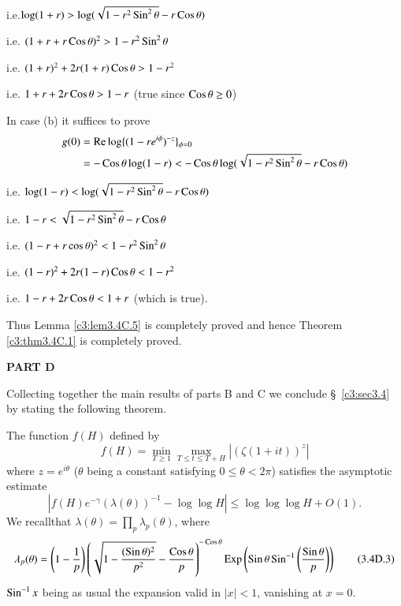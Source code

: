i.e.\pageoriginale $\log (1+r) > \log(\sqrt{1-r^2 \operatorname{Sin}^2 \theta} - r \operatorname{Cos} \theta)$

i.e. $(1+r + r \operatorname{Cos} \theta)^2 > 1 - r^2 \operatorname{Sin}^2 \theta$

i.e. $(1+r)^2 + 2 r (1+r) \operatorname{Cos} \theta > 1 -r^2$

i.e. $1+ r + 2r \operatorname{Cos} \theta > 1 - r$ (true since $\operatorname{Cos} \theta \geq 0$)

In case (b) it suffices to prove
\begin{align*}
g(0) & = \operatorname{Re} \log \{(1-re^{i\phi})^{-z}\}_{\phi = 0}\\
& = - \operatorname{Cos} \theta \log (1-r) < - \operatorname{Cos} \theta \log (\sqrt{1-r^2 \operatorname{Sin}^2 \theta } - r \operatorname{Cos} \theta) 
\end{align*}

i.e. $\log (1-r) < \log (\sqrt{1-r^2 \operatorname{Sin}^2 \theta} -r \operatorname{Cos} \theta)$

i.e. $1-r< \sqrt{1-r^2 \operatorname{Sin}^2 \theta} - r \operatorname{Cos} \theta$

i.e. $(1-r + r \cos \theta)^2 < 1- r^2 \operatorname{Sin}^2 \theta$

i.e. $(1-r)^2 + 2 r (1-r) \operatorname{Cos} \theta < 1 - r^2$

i.e. $1-r + 2 r \operatorname{Cos} \theta <1 + r $ (which is true).

Thus Lemma \ref{c3:lem3.4C.5} is completely proved and hence Theorem \ref{c3:thm3.4C.1} is completely proved.

\begin{center}
\textbf{PART D}
\end{center}


Collecting together the main results of parts B and C we conclude \S\ \ref{c3:sec3.4} by stating the following theorem.


\setcounter{alphtheorem}{0}
\begin{alphtheorem}\label{c3:thm3.4D.1}
The function $f(H)$ defined by
\begin{equation*}
f(H) = \min\limits_{T \geq 1} \max\limits_{T \leq t \leq T + H} |(\zeta(1+it))^z|  \tag{3.4D.1}\label{c3:eq3.4D.1}
\end{equation*}
where $z = e^{i\theta}$ ($\theta$ being a constant satisfying $0 \leq \theta < 2 \pi$) satisfies the asymptotic estimate
\begin{equation*}
|f(H) e^{-\gamma} (\lambda (\theta))^{-1} - \log \log H| \leq \log \log \log H + O(1). \tag{3.4D.2}\label{c3:eq3.4D.2}
\end{equation*}
We recall\pageoriginale that $\lambda (\theta) = \prod\limits_{p} \lambda_p (\theta)$, where
{\fontsize{10}{12}\selectfont
\begin{equation*}
\lambda_p(\theta) = \left(1-\frac{1}{p} \right)
\left(\sqrt{1-\frac{(\operatorname{Sin} \theta)^2}{p^2}} - \frac{\operatorname{Cos} \theta}{p}
\right)^{-\operatorname{Cos} \theta} \operatorname{Exp} \left( \operatorname{Sin} \theta \operatorname{Sin}^{-1} \left(
\frac{\operatorname{Sin} \theta}{p} \right)\right) \tag{3.4D.3}\label{c3:eq3.4D.3} 
\end{equation*}}
$\operatorname{Sin}^{-1} x$ being as usual the expansion valid in $|x| <1$, vanishing at $x=0$. 
\end{alphtheorem}

